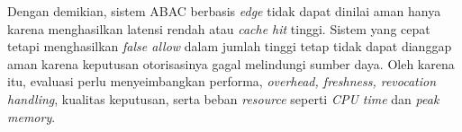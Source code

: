 Dengan demikian, sistem ABAC berbasis \textit{edge} tidak dapat dinilai aman hanya karena menghasilkan latensi rendah atau \textit{cache hit} tinggi. Sistem yang cepat tetapi menghasilkan \textit{false allow} dalam jumlah tinggi tetap tidak dapat dianggap aman karena keputusan otorisasinya gagal melindungi sumber daya. Oleh karena itu, evaluasi perlu menyeimbangkan performa, \textit{overhead, freshness, revocation handling}, kualitas keputusan, serta beban \textit{resource} seperti \textit{CPU time} dan \textit{peak memory}.